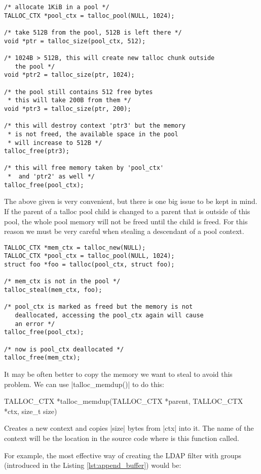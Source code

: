 \begin{lstlisting}[caption={Talloc pool},label=lst:talloc_pool,
morekeywords={talloc_pool}]
/* allocate 1KiB in a pool */
TALLOC_CTX *pool_ctx = talloc_pool(NULL, 1024);

/* take 512B from the pool, 512B is left there */
void *ptr = talloc_size(pool_ctx, 512);

/* 1024B > 512B, this will create new talloc chunk outside
   the pool */
void *ptr2 = talloc_size(ptr, 1024);

/* the pool still contains 512 free bytes
 * this will take 200B from them */
void *ptr3 = talloc_size(ptr, 200);

/* this will destroy context 'ptr3' but the memory
 * is not freed, the available space in the pool
 * will increase to 512B */
talloc_free(ptr3);

/* this will free memory taken by 'pool_ctx'
 *  and 'ptr2' as well */
talloc_free(pool_ctx);
\end{lstlisting}

\noindent
The above given is very convenient, but there is one big issue to be kept in
mind. If the parent of a talloc pool child is changed to a parent that is
outside of this pool, the whole pool memory will not be freed until the child is
freed. For this reason we must be very careful when stealing a descendant of a
pool context.

\begin{lstlisting}[caption={Stealing from pool context},
morekeywords={talloc_pool,talloc_steal,talloc_free}]
TALLOC_CTX *mem_ctx = talloc_new(NULL);
TALLOC_CTX *pool_ctx = talloc_pool(NULL, 1024);
struct foo *foo = talloc(pool_ctx, struct foo);

/* mem_ctx is not in the pool */
talloc_steal(mem_ctx, foo);

/* pool_ctx is marked as freed but the memory is not
   deallocated, accessing the pool_ctx again will cause
   an error */
talloc_free(pool_ctx);

/* now is pool_ctx deallocated */
talloc_free(mem_ctx);
\end{lstlisting}

\noindent
It may be often better to copy the memory we want to steal to avoid this
problem. We can use |talloc_memdup()| to do this:

\begin{funcproto}
TALLOC_CTX *talloc_memdup(TALLOC_CTX *parent,
                          TALLOC_CTX *ctx, size_t size)
\end{funcproto}
\begin{funcdesc}
Creates a new context and copies |size| bytes from |ctx| into it. The name of
the context will be the location in the source code where is this function
called.
\end{funcdesc}
\funclistend
For example, the most effective way of creating the LDAP filter with groups
(introduced in the Listing \ref{lst:append_buffer}) would be:

